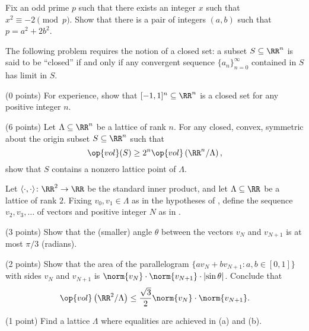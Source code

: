 \documentclass[../notes.tex]{subfiles}
\begin{document}
\begin{prob}[4 points]
	Fix an odd prime $p$ such that there exists an integer $x$ such that $x^2\equiv-2\pmod p$. Show that there is a pair of integers $(a,b)$ such that $p=a^2+2b^2$.
\end{prob}
\begin{prob}[6 points]
	The following problem requires the notion of a closed set: a subset $S\subseteq\RR^n$ is said to be ``closed'' if and only if any convergent sequence $\{a_n\}_{n=0}^\infty$ contained in $S$ has limit in $S$.
	\begin{listalph}
		\item (0 points) For experience, show that $[-1,1]^n\subseteq\RR^n$ is a closed set for any positive integer $n$.
		\item (6 points) Let $\Lambda\subseteq\RR^n$ be a lattice of rank $n$. For any closed, convex, symmetric about the origin subset $S\subseteq\RR^n$ such that
		\[\op{vol}(S)\ge2^n\op{vol}\left(\RR^n/\Lambda\right),\]
		show that $S$ contains a nonzero lattice point of $\Lambda$.
	\end{listalph}
\end{prob}
\begin{prob}[6 points]
	Let $\langle\cdot,\cdot\rangle\colon\RR^2\to\RR$ be the standard inner product, and let $\Lambda\subseteq\RR$ be a lattice of rank $2$. Fixing $v_0,v_1\in\Lambda$ as in the hypotheses of , define the sequence $v_2,v_3,\ldots$ of vectors and positive integer $N$ as in .
	\begin{listalph}
		\item (3 points) Show that the (smaller) angle $\theta$ between the vectors $v_N$ and $v_{N+1}$ is at most $\pi/3$ (radians).
		\item (2 points) Show that the area of the parallelogram $\{av_N+bv_{N+1}:a,b\in[0,1]\}$ with sides $v_N$ and $v_{N+1}$ is $\norm{v_N}\cdot\norm{v_{N+1}}\cdot\left|\sin\theta\right|$. Conclude that
		\[\op{vol}\left(\RR^2/\Lambda\right)\le\frac{\sqrt3}2\norm{v_N}\cdot\norm{v_{N+1}}.\]
		\item (1 point) Find a lattice $\Lambda$ where equalities are achieved in (a) and (b).
	\end{listalph}
\end{prob}
\end{document}
